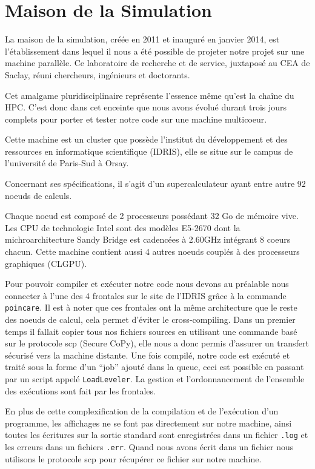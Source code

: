 \section{Maison de la Simulation}

La maison de la simulation, créée en 2011 et inauguré en janvier 2014, est l'établissement
dans lequel il nous a été possible de projeter notre projet sur une machine parallèle. Ce laboratoire
de recherche et de service, juxtaposé au CEA de Saclay, réuni chercheurs, ingénieurs et doctorants.

Cet amalgame pluridisciplinaire représente l'essence même qu'est la chaîne du HPC. C'est donc
dans cet enceinte que nous avons évolué durant trois jours complets pour porter et tester notre
code sur une machine multicoeur.

Cette machine est un cluster que possède l'institut du développement et des ressources en
informatique scientifique (IDRIS), elle se situe sur le campus de l'université de Paris-Sud à Orsay.

Concernant ses spécifications, il s'agit d'un supercalculateur ayant entre autre 92 noeuds de calculs.

Chaque noeud est composé de 2 processeurs possédant 32 Go de mémoire vive. Les CPU de
technologie Intel sont des modèles E5-2670 dont la michroarchitecture Sandy Bridge est
cadencées à 2.60GHz intégrant 8 coeurs chacun. Cette machine contient aussi 4 autres noeuds
couplés à des processeurs graphiques (CLGPU).

Pour pouvoir compiler et exécuter notre code nous devons au préalable nous connecter à
l'une des 4 frontales sur le site de l'IDRIS grâce à la commande \texttt{poincare}.
Il est à noter que ces frontales ont la même architecture que le reste des noeuds de calcul,
cela permet d'éviter le cross-compiling. Dans un premier temps il fallait copier tous nos
fichiers sources en utilisant une commande basé sur le protocole scp (Secure CoPy),
elle nous a donc permis d'assurer un transfert
sécurisé vers la machine distante. Une fois compilé, notre code est exécuté et traité sous la forme
d'un ``job'' ajouté dans la queue, ceci est possible en passant par un script appelé
\texttt{LoadLeveler}. La gestion et l'ordonnancement de l'ensemble des exécutions sont fait par les
frontales.

En plus de cette complexification de la compilation et de l'exécution d'un programme, les
affichages ne se font pas directement sur notre machine, ainsi toutes les écritures sur la sortie
standard sont enregistrées dans un fichier {\tt .log} et les erreurs dans un fichiers {\tt .err}.
Quand nous avons écrit dans un fichier nous utilisons le protocole scp
pour récupérer ce fichier sur notre machine.



